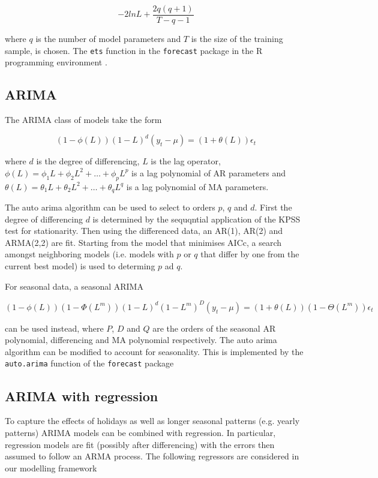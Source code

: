 $$-2lnL+\frac{2q(q+1)}{T-q-1}$$

where $q$  is the number of model parameters and $T$ is the size of the training sample, is chosen. The \texttt{ets} function in the \texttt{forecast} package \citep{ForPac} in the R programming environment \citep{R2020}.

\subsection{ARIMA}

The ARIMA class of models take the form

\[(1-\phi(L))(1-L)^d(y_t-\mu)=(1+\theta(L))\epsilon_t\]

where $d$ is the degree of differencing, $L$ is the lag operator, $\phi(L)=\phi_1L+\phi_2L^2+\dots+\phi_pL^p$ is a lag polynomial of AR parameters and $\theta(L)=\theta_1L+\theta_2L^2+\dots+\theta_qL^q$ is a lag polynomial of MA parameters.

The auto arima algorithm \citep{HynKha2008} can be used to select to orders $p$, $q$ and $d$. First the degree of differencing $d$ is determined by the sequqntial application of the KPSS test for stationarity. Then using the differenced data, an AR(1), AR(2) and ARMA(2,2) are fit. Starting from the model that minimises AICc, a search amongst neighboring models (i.e. models with $p$ or $q$ that differ by one from the current best model) is used to determing $p$ ad $q$.

For seasonal data, a seasonal ARIMA

\[(1-\phi(L))(1-\Phi(L^m))(1-L)^d(1-L^m)^D(y_t-\mu)=(1+\theta(L))(1-\Theta(L^m))\epsilon_t
\]

can be used instead, where $P$, $D$ and $Q$ are the orders of the seasonal AR polynomial, differencing and MA polynomial respectively. The auto arima algorithm can be modified to account for seasonality. This is implemented by the \texttt{auto.arima} function of the \texttt{forecast} package

\subsection{ARIMA with regression}

To capture the effects of holidays as well as longer seasonal patterns (e.g. yearly patterns) ARIMA models can be combined with regression. In particular, regression models are fit (possibly after differencing) with the errors then assumed to follow an ARMA process. The following regressors are considered in our modelling framework

